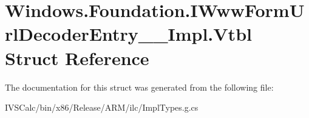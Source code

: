 \hypertarget{struct_windows_1_1_foundation_1_1_i_www_form_url_decoder_entry_____impl_1_1_vtbl}{}\section{Windows.\+Foundation.\+I\+Www\+Form\+Url\+Decoder\+Entry\+\_\+\+\_\+\+Impl.\+Vtbl Struct Reference}
\label{struct_windows_1_1_foundation_1_1_i_www_form_url_decoder_entry_____impl_1_1_vtbl}


The documentation for this struct was generated from the following file\+:\begin{DoxyCompactItemize}
\item 
I\+V\+S\+Calc/bin/x86/\+Release/\+A\+R\+M/ilc/Impl\+Types.\+g.\+cs\end{DoxyCompactItemize}
